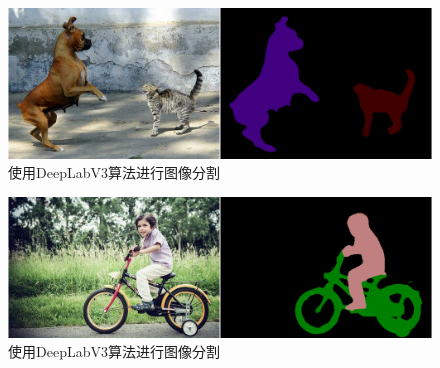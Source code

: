 \documentclass[a4paper]{article}
\begin{document}
\begin{figure}[!h]
	\centering
	\includegraphics[width=0.96\columnwidth]{../result/test9deeplab}
	\caption{\label{fig:8}使用DeepLabV3算法进行图像分割}
\end{figure}

\begin{figure}[!h]
	\centering
	\includegraphics[width=0.96\columnwidth]{../result/test8deeplab}
	\caption{\label{fig:7}使用DeepLabV3算法进行图像分割}
\end{figure}
\end{document}

